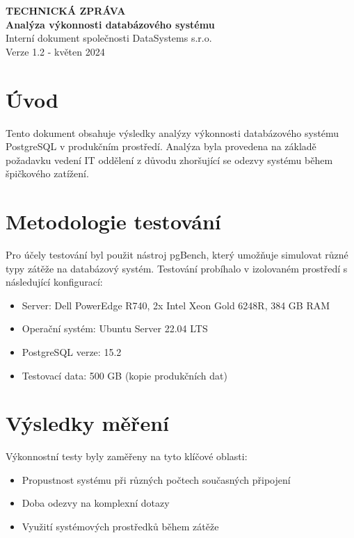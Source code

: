 \documentclass[a4paper,12pt]{article}
\begin{document}
\begin{center}
    {\Large \textbf{TECHNICKÁ ZPRÁVA}} \\
    \vspace{0.5cm}
    {\large \textbf{Analýza výkonnosti databázového systému}} \\
    \vspace{0.3cm}
    Interní dokument společnosti DataSystems s.r.o. \\
    \vspace{0.2cm}
    Verze 1.2 - květen 2024
\end{center}

\vspace{1cm}

\section{Úvod}
Tento dokument obsahuje výsledky analýzy výkonnosti databázového systému PostgreSQL v produkčním prostředí. Analýza byla provedena na základě požadavku vedení IT oddělení z důvodu zhoršující se odezvy systému během špičkového zatížení.

\section{Metodologie testování}
Pro účely testování byl použit nástroj pgBench, který umožňuje simulovat různé typy zátěže na databázový systém. Testování probíhalo v izolovaném prostředí s následující konfigurací:

\begin{itemize}
    \item Server: Dell PowerEdge R740, 2x Intel Xeon Gold 6248R, 384 GB RAM
    \item Operační systém: Ubuntu Server 22.04 LTS
    \item PostgreSQL verze: 15.2
    \item Testovací data: 500 GB (kopie produkčních dat)
\end{itemize}

\section{Výsledky měření}
Výkonnostní testy byly zaměřeny na tyto klíčové oblasti:
\begin{itemize}
    \item Propustnost systému při různých počtech současných připojení
    \item Doba odezvy na komplexní dotazy
    \item Využití systémových prostředků během zátěže
\end{itemize}
\end{document}
